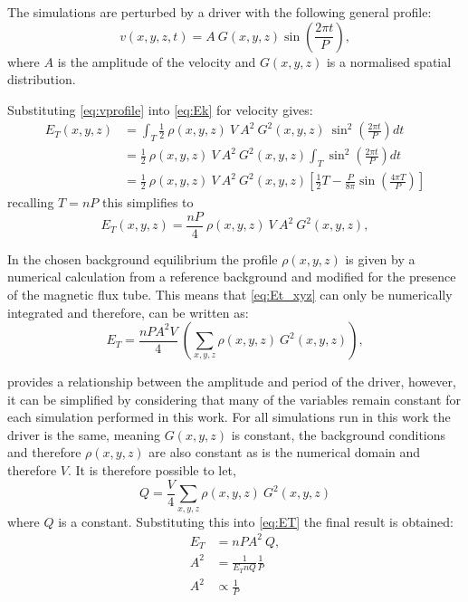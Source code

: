 The simulations are perturbed by a driver with the following general profile:
\begin{equation}
    v(x,y,z,t) = A\ G(x,y,z) \sin \left( \frac{2\pi t}{P} \right),\label{eq:vprofile}
\end{equation}
where $A$ is the amplitude of the velocity and $G(x,y,z)$ is a normalised spatial distribution.

Substituting \cref{eq:vprofile} into \cref{eq:Ek} for velocity gives:
\begin{align}
    E_{T}(x,y,z) &= \int_T \frac{1}{2}\ \rho(x,y,z)\ V\ A^2\ G^2(x,y,z)\ \sin^2\left(\frac{2\pi t}{P} \right) dt \\
    &= \frac{1}{2}\ \rho(x,y,z)\ V\ A^2\ G^2(x,y,z) \int_T \sin^2\left(\frac{2\pi t}{P} \right) dt \\
    & = \frac{1}{2}\ \rho(x,y,z)\ V\ A^2\ G^2(x,y,z) \left[ \frac{1}{2}T - \frac{P}{8\pi} \sin \left(\frac{4\pi T}{P} \right) \right]
\end{align}
recalling $T = nP$ this simplifies to 
\begin{equation}
    E_{T}(x,y,z) = \frac{nP}{4}\ \rho(x,y,z)\ V\ A^2\ G^2(x,y,z), \label{eq:Et_xyz}
\end{equation}

In the chosen background equilibrium the profile $\rho(x,y,z)$ is given by a numerical calculation from a reference background and modified for the presence of the magnetic flux tube.
This means that \cref{eq:Et_xyz} can only be numerically integrated and therefore, can be written as:
\begin{equation}
    E_T = \frac{nPA^2V}{4}\ \left( \sum_{x,y,z} \rho(x,y,z)\ G^2(x,y,z) \right),\label{eq:ET}
\end{equation}

 provides a relationship between the amplitude and period of the driver, however, it can be simplified by considering that many of the variables remain constant for each simulation performed in this work.
For all simulations run in this work the driver is the same, meaning $G(x,y,z)$ is constant, the background conditions and therefore $\rho(x,y,z)$ are also constant as is the numerical domain and therefore $V$.
It is therefore possible to let,
\begin{equation}
    Q = \frac{V}{4} \sum_{x,y,z} \rho(x,y,z)\ G^2(x,y,z)
\end{equation}
where $Q$ is a constant.
Substituting this into \cref{eq:ET} the final result is obtained:
\begin{align}
    E_T &= nPA^2\ Q, \\
    A^2 &= \frac{1}{E_T n Q} \frac{1}{P} \\
    A^2 &\propto \frac{1}{P}
\end{align}

